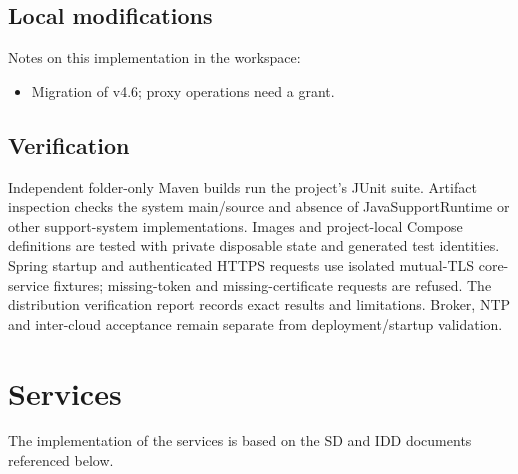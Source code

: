 \documentclass[a4paper]{arrowhead}
\begin{document}
\subsection{Local modifications}
\label{sec:local}

Notes on this implementation in the workspace:
\begin{itemize}
  \item Migration of v4.6; proxy operations need a grant.
\end{itemize}

\subsection{Verification}

Independent folder-only Maven builds run the project's JUnit suite. Artifact inspection checks the system main/source and absence of JavaSupportRuntime or other support-system implementations. Images and project-local Compose definitions are tested with private disposable state and generated test identities. Spring startup and authenticated HTTPS requests use isolated mutual-TLS core-service fixtures; missing-token and missing-certificate requests are refused. The distribution verification report records exact results and limitations. Broker, NTP and inter-cloud acceptance remain separate from deployment/startup validation.

\newpage

\section{Services}
\label{sec:services}

The implementation of the services is based on the SD and IDD documents referenced below.
\end{document}
